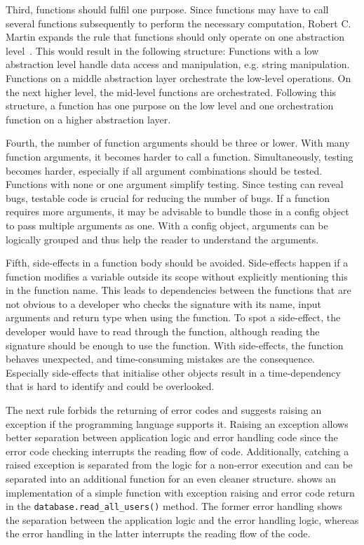 Third, functions should fulfil one purpose. Since functions may have to call several functions subsequently to perform the necessary computation, Robert C. Martin expands the rule that functions should only operate on one abstraction level~\cite{martin_clean_2009}. This would result in the following structure:
Functions with a low abstraction level handle data access and manipulation, e.g. string manipulation. Functions on a middle abstraction layer orchestrate the low-level operations. On the next higher level, the mid-level functions are orchestrated. Following this structure, a function has one purpose on the low level and one orchestration function on a higher abstraction layer. 

Fourth, the number of function arguments should be three or lower. With many function arguments, it becomes harder to call a function. Simultaneously, testing becomes harder, especially if all argument combinations should be tested. Functions with none or one argument simplify testing. Since testing can reveal bugs, testable code is crucial for reducing the number of bugs.
If a function requires more arguments, it may be advisable to bundle those in a config object to pass multiple arguments as one. With a config object, arguments can be logically grouped and thus help the reader to understand the arguments. 

Fifth, side-effects in a function body should be avoided. Side-effects happen if a function modifies a variable outside its scope without explicitly mentioning this in the function name. This leads to dependencies between the functions that are not obvious to a developer who checks the signature with its name, input arguments and return type when using the function. To spot a side-effect, the developer would have to read through the function, although reading the signature should be enough to use the function. With side-effects, the function behaves unexpected, and time-consuming mistakes are the consequence. Especially side-effects that initialise other objects result in a time-dependency that is hard to identify and could be overlooked.

The next rule forbids the returning of error codes and suggests raising an exception if the programming language supports it. Raising an exception allows better separation between application logic and error handling code since the error code checking interrupts the reading flow of code. Additionally, catching a raised exception is separated from the logic for a non-error execution and can be separated into an additional function for an even cleaner structure.  shows an implementation of a simple function with exception raising and error code return in the \texttt{database.read\_all\_users()} method. The former error handling shows the separation between the application logic and the error handling logic, whereas the error handling in the latter interrupts the reading flow of the code.

